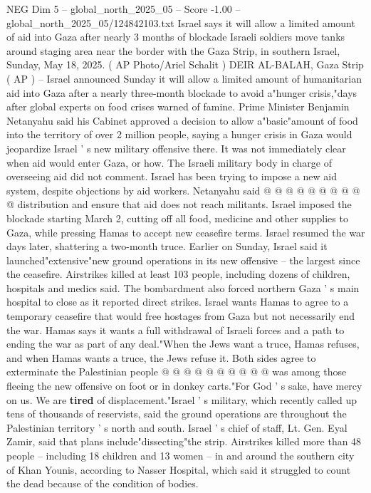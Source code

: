 \begin{textsample}{NEG Dim 5 – global\_north\_2025\_05 – Score -1.00 – global\_north\_2025\_05/124842103.txt}  \label{ex:f5_neg_324}
Israel says it will allow a limited amount of aid into Gaza after nearly 3 months of blockade Israeli soldiers move tanks around staging area near the border with the Gaza Strip, in southern Israel, Sunday, May 18, 2025. ( AP Photo/Ariel Schalit ) DEIR AL-BALAH, Gaza Strip ( AP ) -- Israel announced Sunday it will allow a limited amount of humanitarian aid into Gaza after a nearly three-month blockade to avoid a"hunger crisis,"days after global experts on food crises warned of famine.
Prime Minister Benjamin Netanyahu said his Cabinet approved a decision to allow a"basic"amount of food into the territory of over 2 million people, saying a hunger crisis in Gaza would jeopardize Israel ' s new military offensive there.
It was not immediately clear when aid would enter Gaza, or how.
The Israeli military body in charge of overseeing aid did not comment.
Israel has been trying to impose a new aid system, despite objections by aid workers.
Netanyahu said @ @ @ @ @ @ @ @ @ @ distribution and ensure that aid does not reach militants.
Israel imposed the blockade starting March 2, cutting off all food, medicine and other supplies to Gaza, while pressing Hamas to accept new ceasefire terms.
Israel resumed the war days later, shattering a two-month truce.
Earlier on Sunday, Israel said it launched"extensive"new ground operations in its new offensive -- the largest since the ceasefire.
Airstrikes killed at least 103 people, including dozens of children, hospitals and medics said.
The bombardment also forced northern Gaza ' s main hospital to close as it reported direct strikes.
Israel wants Hamas to agree to a temporary ceasefire that would free hostages from Gaza but not necessarily end the war.
Hamas says it wants a full withdrawal of Israeli forces and a path to ending the war as part of any deal."When the Jews want a truce, Hamas refuses, and when Hamas wants a truce, the Jews refuse it.
Both sides agree to exterminate the Palestinian people @ @ @ @ @ @ @ @ @ @ was among those fleeing the new offensive on foot or in donkey carts."For God ' s sake, have mercy on us.
We are \textbf{tired} of displacement."Israel ' s military, which recently called up tens of thousands of reservists, said the ground operations are throughout the Palestinian territory ' s north and south.
Israel ' s chief of staff, Lt.
Gen.
Eyal Zamir, said that plans include"dissecting"the strip.
Airstrikes killed more than 48 people -- including 18 children and 13 women -- in and around the southern city of Khan Younis, according to Nasser Hospital, which said it struggled to count the dead because of the condition of bodies.

\end{textsample}
